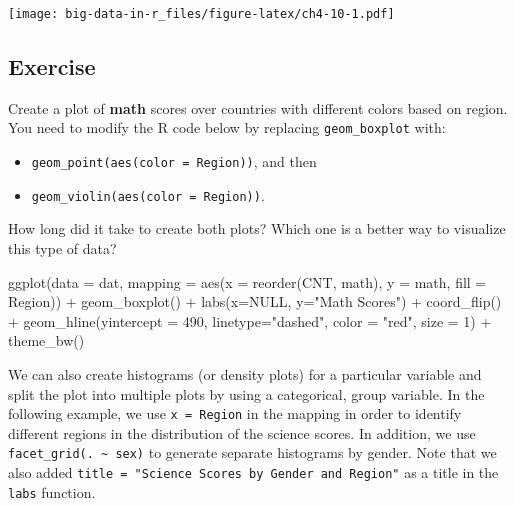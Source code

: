 \documentclass[
]{book}
\newenvironment{Shaded}{\begin{snugshade}}{\end{snugshade}}
\newcommand{\AttributeTok}[1]{\textcolor[rgb]{0.77,0.63,0.00}{#1}}
\newcommand{\ConstantTok}[1]{\textcolor[rgb]{0.00,0.00,0.00}{#1}}
\newcommand{\DecValTok}[1]{\textcolor[rgb]{0.00,0.00,0.81}{#1}}
\newcommand{\FunctionTok}[1]{\textcolor[rgb]{0.00,0.00,0.00}{#1}}
\newcommand{\NormalTok}[1]{#1}
\newcommand{\SpecialCharTok}[1]{\textcolor[rgb]{0.00,0.00,0.00}{#1}}
\newcommand{\StringTok}[1]{\textcolor[rgb]{0.31,0.60,0.02}{#1}}
\providecommand{\tightlist}{%
  \setlength{\itemsep}{0pt}\setlength{\parskip}{0pt}}
\begin{document}
\texttt{[image: big-data-in-r\_files/figure-latex/ch4-10-1.pdf]}

\hypertarget{exercise}{%
\subsection{Exercise}\label{exercise}}

Create a plot of \textbf{math} scores over countries with different colors based on region. You need to modify the R code below by replacing \texttt{geom\_boxplot} with:

\begin{itemize}
\tightlist
\item
  \texttt{geom\_point(aes(color\ =\ Region))}, and then
\item
  \texttt{geom\_violin(aes(color\ =\ Region))}.
\end{itemize}

How long did it take to create both plots? Which one is a better way to visualize this type of data?

\begin{Shaded}
\begin{Highlighting}[]
\FunctionTok{ggplot}\NormalTok{(}\AttributeTok{data =}\NormalTok{ dat,}
       \AttributeTok{mapping =} \FunctionTok{aes}\NormalTok{(}\AttributeTok{x =} \FunctionTok{reorder}\NormalTok{(CNT, math), }\AttributeTok{y =}\NormalTok{ math, }\AttributeTok{fill =}\NormalTok{ Region)) }\SpecialCharTok{+}
  \FunctionTok{geom\_boxplot}\NormalTok{() }\SpecialCharTok{+}
  \FunctionTok{labs}\NormalTok{(}\AttributeTok{x=}\ConstantTok{NULL}\NormalTok{, }\AttributeTok{y=}\StringTok{"Math Scores"}\NormalTok{) }\SpecialCharTok{+}
  \FunctionTok{coord\_flip}\NormalTok{() }\SpecialCharTok{+}
  \FunctionTok{geom\_hline}\NormalTok{(}\AttributeTok{yintercept =} \DecValTok{490}\NormalTok{, }\AttributeTok{linetype=}\StringTok{"dashed"}\NormalTok{, }\AttributeTok{color =} \StringTok{"red"}\NormalTok{, }\AttributeTok{size =} \DecValTok{1}\NormalTok{) }\SpecialCharTok{+}
  \FunctionTok{theme\_bw}\NormalTok{()}
\end{Highlighting}
\end{Shaded}

We can also create histograms (or density plots) for a particular variable and split the plot into multiple plots by using a categorical, group variable. In the following example, we use \texttt{x\ =\ Region} in the mapping in order to identify different regions in the distribution of the science scores. In addition, we use \texttt{facet\_grid(.\ \textasciitilde{}\ sex)} to generate separate histograms by gender. Note that we also added \texttt{title\ =\ "Science\ Scores\ by\ Gender\ and\ Region"} as a title in the \texttt{labs} function.
\end{document}
